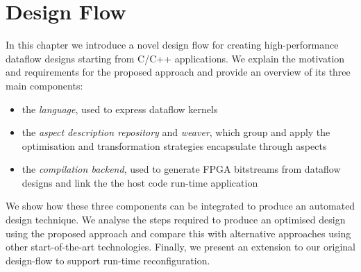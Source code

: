 \chapter{Design Flow}
\label{sec:design-flow}

In this chapter we introduce a novel design flow for creating
high-performance dataflow designs starting from C/C++ applications. We
explain the motivation and requirements for the proposed approach and
provide an overview of its three main components:
\begin{itemize}
\item the \emph{\FAST{} language}, used to express dataflow kernels
\item the \emph{aspect description repository} and \emph{weaver}, which group
  and apply the optimisation and transformation strategies encapsulate
  through aspects
\item the \emph{compilation backend}, used to generate FPGA bitstreams
  from dataflow designs and link the the host code run-time
  application
\end{itemize}
We show how these three components can be integrated to produce an
automated design technique. We analyse the steps required to produce
an optimised design using the proposed approach and compare this with
alternative approaches using other start-of-the-art
technologies. Finally, we present an extension to our original
design-flow to support run-time reconfiguration.

